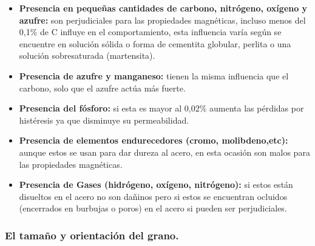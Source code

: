 \documentclass[12pt,a4paper]{article}
\begin{document}
\begin{itemize}
    \item \textbf{Presencia en pequeñas cantidades de carbono, nitrógeno, oxígeno y azufre:} son perjudiciales para las propiedades magnéticas, incluso menos del 0,1\% de C influye en el comportamiento, esta influencia varía según se encuentre en solución sólida o forma de cementita globular, perlita o una solución sobresaturada (martensita).
    \item \textbf{Presencia de azufre y manganeso:}  tienen la misma influencia que el carbono, solo que el azufre actúa más fuerte.
    \item \textbf{Presencia del fósforo:} si esta es mayor al 0,02\% aumenta las pérdidas por histéresis ya que disminuye su permeabilidad.
    \item \textbf{Presencia de elementos endurecedores (cromo, molibdeno,etc):} aunque estos se usan para dar dureza al acero, en esta ocasión son malos para las propiedades magnéticas.
    \item \textbf{Presencia de Gases (hidrógeno, oxígeno, nitrógeno):} si estos están disueltos en el acero no son dañinos pero si estos se encuentran ocluidos (encerrados en burbujas o poros) en el acero si pueden ser perjudiciales.
\end{itemize}

\subsubsection{El tamaño y orientación del grano.}
\end{document}
